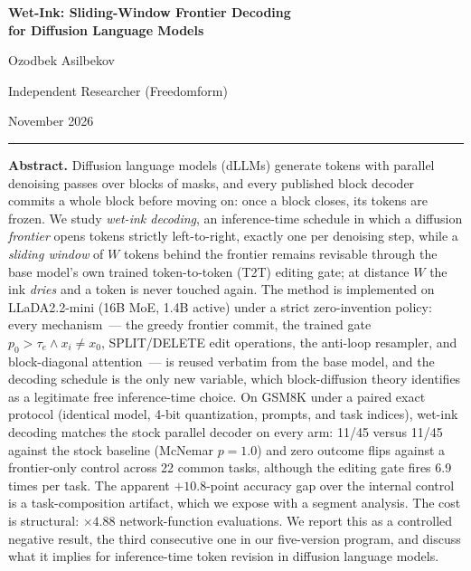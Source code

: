 \documentclass[11pt,a4paper]{article}
\begin{document}
\begin{center}
  {\LARGE\bfseries Wet-Ink: Sliding-Window Frontier Decoding\\[0.35em]
  for Diffusion Language Models\par}
  \vspace{1.4em}
  {\large Ozodbek Asilbekov\par}
  \vspace{0.35em}
  {\normalsize Independent Researcher (Freedomform)\par}
  \vspace{0.35em}
  {\small November 2026\par}
\end{center}

\vspace{0.9em}
\noindent\rule{\textwidth}{0.5pt}
\vspace{0.4em}

\begin{center}\begin{minipage}{0.9\textwidth}
\textbf{Abstract.}
Diffusion language models (dLLMs) generate tokens with parallel denoising passes over
blocks of masks, and every published block decoder commits a whole block before moving on:
once a block closes, its tokens are frozen. We study \emph{wet-ink decoding}, an
inference-time schedule in which a diffusion \emph{frontier} opens tokens strictly
left-to-right, exactly one per denoising step, while a \emph{sliding window} of $W$
tokens behind the frontier remains revisable through the base model's own trained
token-to-token (T2T) editing gate; at distance $W$ the ink \emph{dries} and a token is
never touched again. The method is implemented on LLaDA2.2-mini
(16B MoE, 1.4B active) under a strict zero-invention policy: every mechanism~--- the
greedy frontier commit, the trained gate $p_0>\tau_e \wedge x_i \neq x_0$, SPLIT/DELETE
edit operations, the anti-loop resampler, and block-diagonal attention~--- is reused
verbatim from the base model, and the decoding schedule is the only new variable, which
block-diffusion theory identifies as a legitimate free inference-time choice.
On GSM8K under a paired exact protocol (identical model, 4-bit quantization, prompts,
and task indices), wet-ink decoding matches the stock parallel decoder on every arm:
11/45 versus 11/45 against the stock baseline (McNemar $p=1.0$) and zero outcome flips
against a frontier-only control across 22 common tasks, although the editing gate fires
6.9 times per task. The apparent $+10.8$-point accuracy gap over the internal control is
a task-composition artifact, which we expose with a segment analysis. The cost is
structural: $\times 4.88$ network-function evaluations. We report this as a controlled
negative result, the third consecutive one in our five-version program, and discuss what
it implies for inference-time token revision in diffusion language models.
\end{minipage}\end{center}
\end{document}
